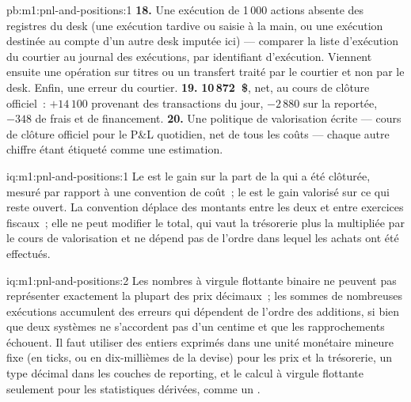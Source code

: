 \begin{solution}{pb:m1:pnl-and-positions:1}
\textbf{18.} Une exécution de 1\,000 actions absente des registres du desk (une
exécution tardive ou saisie à la main, ou une exécution destinée au compte d'un autre desk
imputée ici) --- comparer la liste d'exécution du courtier au journal des exécutions,
par identifiant d'exécution. Viennent ensuite une opération sur titres ou un transfert traité par le
courtier et non par le desk. Enfin, une erreur du courtier.
\textbf{19.} \textbf{10\,872~\$}, net, au cours de clôture officiel~: $+14\,100$ provenant
des transactions du jour, $-2\,880$ sur la  reportée, $-348$ de frais et
de financement.
\textbf{20.} Une politique de valorisation écrite --- cours de clôture officiel pour le
P\&L quotidien, net de tous les coûts --- chaque autre chiffre étant étiqueté comme une estimation.
\end{solution}

\begin{solution}{iq:m1:pnl-and-positions:1}
Le  est le gain sur la part de la  qui a été clôturée,
mesuré par rapport à une convention de coût~; le  est le gain valorisé sur ce qui
reste ouvert. La convention déplace des montants entre les deux et entre exercices
fiscaux~; elle ne peut modifier le total, qui vaut la trésorerie plus la  multipliée par le cours
de valorisation et ne dépend pas de l'ordre dans lequel les achats ont été effectués.
\end{solution}

\begin{solution}{iq:m1:pnl-and-positions:2}
Les nombres à virgule flottante binaire ne peuvent pas représenter exactement la plupart des prix décimaux~; les sommes de
nombreuses exécutions accumulent des erreurs qui dépendent de l'ordre des additions, si bien que deux
systèmes ne s'accordent pas d'un centime et que les rapprochements échouent. Il faut utiliser des entiers exprimés dans une
unité monétaire mineure fixe (en ticks, ou en dix-millièmes de la devise) pour les prix et
la trésorerie, un type décimal dans les couches de reporting, et le calcul à virgule flottante seulement pour les
statistiques dérivées, comme un .
\end{solution}

